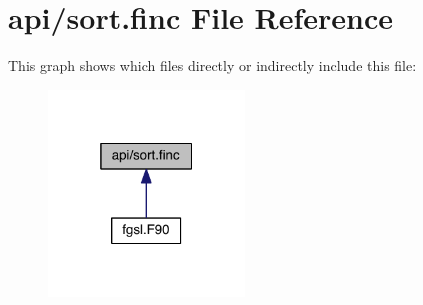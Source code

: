 \hypertarget{sort_8finc}{\section{api/sort.finc File Reference}
\label{sort_8finc}
}
This graph shows which files directly or indirectly include this file\-:
\nopagebreak
\begin{figure}[H]
\begin{center}
\leavevmode
\includegraphics[width=148pt]{sort_8finc__dep__incl}
\end{center}
\end{figure}
